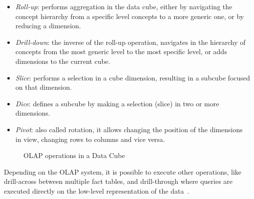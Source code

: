 \begin{itemize}
  \item \textit{Roll-up}: performs aggregation in the data cube, either by navigating the concept hierarchy from a specific level concepts to a more generic one, or by reducing a dimension.
  \item \textit{Drill-down}: the inverse of the roll-up operation, navigates in the hierarchy of concepts from the most generic level to the most specific level, or adds dimensions to the current cube.
  \item \textit{Slice}: performs a selection in a cube dimension, resulting in a subcube focused on that dimension.
  \item \textit{Dice}: defines a subcube by making a selection (slice) in two or more dimensions.
  \item \textit{Pivot}: also called rotation, it allows changing the position of the dimensions in view, changing rows to columns and vice versa.
\end{itemize}

\begin{figure}[!htb]
  \caption{OLAP operations in a Data Cube}\label{fig:olap}
  \vspace{4mm}
  \begin{center}
  \end{center}
  \vspace{2mm}
\end{figure}

Depending on the OLAP system, it is possible to execute other operations, like drill-across between multiple fact tables, and drill-through where queries are executed directly on the low-level representation of the data~\cite{hanDataMiningConcepts2011}.

